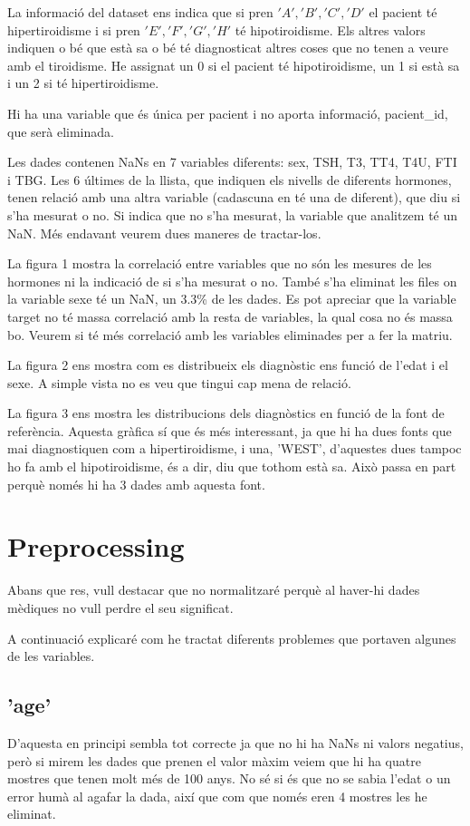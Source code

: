 \documentclass[9pt,a4paper,twoside]{tau-class/tau}
\begin{document}
    La informació del dataset ens indica que si pren $'A', 'B', 'C', 'D'$ el pacient té hipertiroidisme i si pren $'E', 'F', 'G', 'H'$ té hipotiroidisme. Els altres valors indiquen o bé que està sa o bé té diagnosticat altres coses que no tenen a veure amb el tiroidisme. He assignat un 0 si el pacient té hipotiroidisme, un 1 si està sa i un 2 si té hipertiroidisme.
    
    Hi ha una variable que és única per pacient i no aporta informació, pacient\_id, que serà eliminada.

    Les dades contenen NaNs en 7 variables diferents: sex, TSH, T3, TT4, T4U, FTI i TBG. Les 6 últimes de la llista, que indiquen els nivells de diferents hormones, tenen relació amb una altra variable (cadascuna en té una de diferent), que diu si s'ha mesurat o no. Si indica que no s'ha mesurat, la variable que analitzem té un NaN. Més endavant veurem dues maneres de tractar-los.

    La figura 1 mostra la correlació entre variables que no són les mesures de les hormones ni la indicació de si s'ha mesurat o no. També s'ha eliminat les files on la variable sexe té un NaN, un 3.3\% de les dades. Es pot apreciar que la variable target no té massa correlació amb la resta de variables, la qual cosa no és massa bo. Veurem si té més correlació amb les variables eliminades per a fer la matriu.

    La figura 2 ens mostra com es distribueix els diagnòstic ens funció de l'edat i el sexe. A simple vista no es veu que tingui cap mena de relació.

    La figura 3 ens mostra les distribucions dels diagnòstics en funció de la font de referència. Aquesta gràfica sí que és més interessant, ja que hi ha dues fonts que mai diagnostiquen com a hipertiroidisme, i una, 'WEST', d'aquestes dues tampoc ho fa amb el hipotiroidisme, és a dir, diu que tothom està sa. Això passa en part perquè només hi ha 3 dades amb aquesta font.

\section{Preprocessing}

    Abans que res, vull destacar que no normalitzaré perquè al haver-hi dades mèdiques no vull perdre el seu significat.

    A continuació explicaré com he tractat diferents problemes que portaven algunes de les variables.
    \subsection{'age'}
    D'aquesta en principi sembla tot correcte ja que no hi ha NaNs ni valors negatius, però si mirem les dades que prenen el valor màxim veiem que hi ha quatre mostres que tenen molt més de 100 anys. No sé si és que no se sabia l'edat o un error humà al agafar la dada, així que com que només eren 4 mostres les he eliminat.
\end{document}
